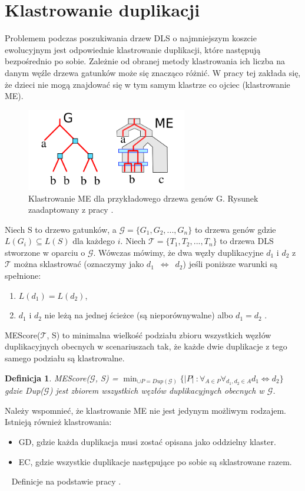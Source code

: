\documentclass[licencjacka]{pracamgr}
\newtheorem{defi}{Definicja}[section]
\begin{document}
\section{Klastrowanie duplikacji}

Problemem podczas poszukiwania drzew DLS o najmniejszym koszcie ewolucyjnym jest odpowiednie klastrowanie duplikacji, które następują bezpośrednio po sobie. Zależnie od obranej metody klastrowania ich liczba na danym węźle drzewa gatunków może się znacząco różnić. W pracy tej zakłada się, że dzieci nie mogą znajdować się w tym samym klastrze co ojciec (klastrowanie ME). 

\begin{figure}[H]
  \centering
  \includegraphics[width=70mm]{./pictures/clas_type_me.png}
  \caption{Klastrowanie ME dla przykładowego drzewa genów G. Rysunek zaadaptowany z pracy \cite{pasz}.}
\end{figure}



Niech S to drzewo gatunków, a $\mathcal{G}=\{G_1,G_2, ... , G_n\}$ to drzewa genów gdzie $L(G_i) \subseteq L(S)$ dla każdego $i$. Niech $\mathcal{T}=\{T_1,T_2, ... , T_n\}$ to drzewa DLS stworzone w oparciu o $\mathcal{G}$. Wówczas mówimy, że dwa węzły duplikacyjne $d_1$ i $d_2$ z $\mathcal{T}$ można sklastrować (oznaczymy jako $d_1$~$\Longleftrightarrow$~$d_2$)  jeśli poniższe warunki są spełnione:
\begin{enumerate}
\item $L(d_1) = L({d_2})$,
\item $d_1$ i $d_2$ nie leżą na jednej ścieżce (są nieporównywalne) albo $d_1=d_2$ .
\end{enumerate}

MEScore($\mathcal{T}$, S) to minimalna wielkość podziału zbioru wszystkich węzłów duplikacyjnych obecnych w scenariuszach tak, że każde dwie duplikacje z tego samego podziału są klastrowalne.

\begin{defi}\label{ME}
  MEScore($\mathcal{G}$, S) = $\min_{\cup P = Dup(\mathcal{G})} \lbrace \vert P \vert\ : \forall_{A \in P} \forall_{d_1,d_2 \in A} d_1 \Longleftrightarrow d_2 \rbrace$
 gdzie Dup($\mathcal{G}$) jest zbiorem wszystkich węzłów duplikacyjnych obecnych w $\mathcal{G}$.
 
\end{defi}
Należy wspomnieć, że klastrowanie ME nie jest jedynym możliwym rodzajem. Istnieją również klastrowania:
\begin{itemize}
\item GD, gdzie każda duplikacja musi zostać opisana jako oddzielny klaster.
\item EC, gdzie wszystkie duplikacje następujące po sobie są sklastrowane razem.
\end{itemize}
~\linebreak
Definicje na podstawie pracy \cite{pasz}.
\end{document}
